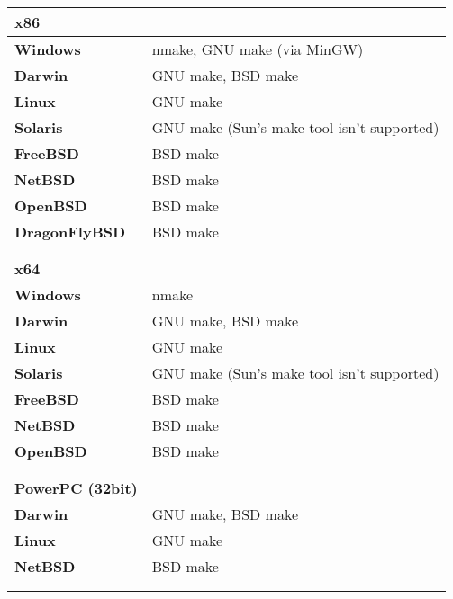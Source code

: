 \begin{tabular}{l l}
{\bf{\large x86}} &                                            \\
\hline\hline
{\bf Windows}      & nmake, GNU make (via MinGW)               \\
{\bf Darwin}       & GNU make, BSD make                        \\
{\bf Linux}        & GNU make                                  \\
{\bf Solaris}      & GNU make (Sun's make tool isn't supported)\\
{\bf FreeBSD}      & BSD make                                  \\
{\bf NetBSD}       & BSD make                                  \\
{\bf OpenBSD}      & BSD make                                  \\
{\bf DragonFlyBSD} & BSD make                                  \\
\hline
                   &                                           \\
                   &                                           \\


{\bf{\large x64}}  &                                           \\
\hline\hline
{\bf Windows}      & nmake                                     \\
{\bf Darwin}       & GNU make, BSD make                        \\
{\bf Linux}        & GNU make                                  \\
{\bf Solaris}      & GNU make (Sun's make tool isn't supported)\\
{\bf FreeBSD}      & BSD make                                  \\
{\bf NetBSD}       & BSD make                                  \\
{\bf OpenBSD}      & BSD make                                  \\
\hline
                   &                                           \\
                   &                                           \\


{\bf{\large PowerPC (32bit)}} &                                \\
\hline\hline
{\bf Darwin}       & GNU make, BSD make                        \\
{\bf Linux}        & GNU make                                  \\
{\bf NetBSD}       & BSD make                                  \\
\hline
                   &                                           \\
                   &                                           \\



\end{tabular}
